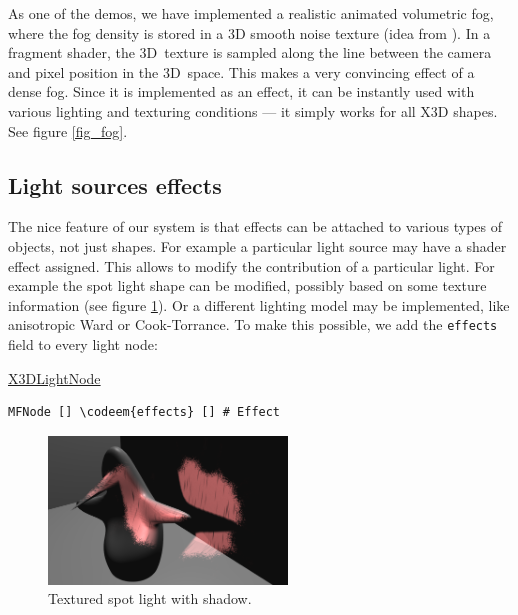 \documentclass{egpubl}
\newenvironment{mycode}
{\begin{mycodecore}}
{\end{mycodecore}
\vspace{-0.1in}}
\newcommand*{\codeem}[1]{\textbf{#1}}
\begin{document}
As one of the demos, we have implemented a realistic
animated volumetric fog, where the fog density is stored in
a 3D smooth noise texture (idea from \cite{humus:volumetricfog}).
In a fragment shader, the 3D~texture is sampled
along the line between the camera and pixel position in the 3D~space. This makes a very
convincing effect of a dense fog. Since it is implemented as an effect,
it can be instantly used with various lighting and texturing conditions
--- it simply works for all X3D shapes. See figure \ref{fig_fog}.

\subsection{Light sources effects}

The nice feature of our system is that effects can be attached to various
types of objects, not just shapes. For example a particular light source
may have a shader effect assigned.
This allows to modify the contribution of a particular light.
For example the spot light shape can be modified, possibly
based on some texture information (see figure \ref{fig_fancy_spot}).
Or a different lighting model may be implemented, like anisotropic Ward
or Cook-Torrance.
To make this possible, we add the \texttt{effects} field to every light node:

\begin{mycode}
\underline{X3DLightNode}
\begin{Verbatim}[commandchars=\\\{\},fontsize=\small]
MFNode [] \codeem{effects} [] # Effect
\end{Verbatim}
\end{mycode}

\begin{figure}[H]
  \centering
  \includegraphics[width=2.5in]{fancy_light_spot_shape-cropped}
  \caption{Textured spot light with shadow.}
  \label{fig_fancy_spot}
\end{figure}

\end{document}
